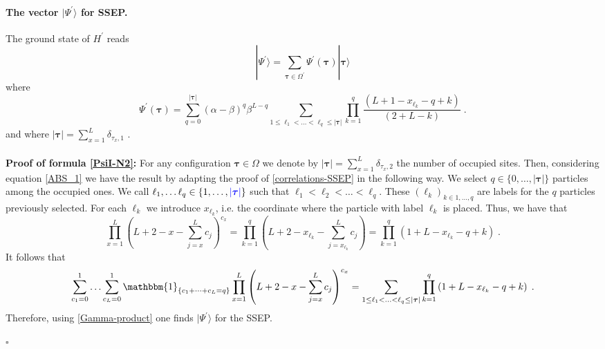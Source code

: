 \documentclass[10pt]{article}
\numberwithin{equation}{section}
\numberwithin{equation}{subsection}
\newcommand{\dt}{\;.}
\newcommand{\fra}[1]{\textcolor[rgb]{0,0,1}{#1}}
\begin{document}
{\paragraph{The vector $|\Psi^{'}\rangle$ for SSEP.} The ground state of $H^{'}$ reads
\begin{equation}
	|\Psi^{'}\rangle=\sum_{\bm{\tau}\in\Omega^{'}}\Psi^{'}(\bm{\tau})|\bm{\tau}\rangle
\end{equation}
where 
\begin{equation}\label{PsiI-N2}
	\Psi^{'}(\bm{\tau})=\sum_{q=0}^{|\bm{\tau}|}(\alpha-\beta)^{q}\beta^{L-q}\sum_{1\leq \ell_{1}<\ldots<\ell_{q}\leq |\bm{\tau}|}\prod_{k=1}^{q}\frac{\left(L+1-x_{\ell_{k}}-q+k\right)}{(2+L-k)}\dt
\end{equation}
and where $|\bm{\tau}|=\sum_{x=1}^{L}\delta_{\tau_{x},1}$ . \\ \\
 \textbf{Proof of formula \eqref{PsiI-N2}:}  For any configuration $\bm{\tau}\in \Omega$ we denote by  $|\bm{\tau}|=\sum_{x=1}^{L}\delta_{\tau_{x},2}$ the number of occupied sites. Then, considering equation \eqref{ABS_1} we have the result by adapting the proof of \eqref{correlations-SSEP} in the following way. We select $q\in\{0,\ldots,|\bm{\tau}|\}$ particles among the occupied ones. We call $\ell_{1},\ldots\ell_{q}\in \{1,\ldots,\fra{|\bm{\tau}|}\}$ such that $\ell_{1}<\ell_{2}<\ldots<\ell_{q}$. These $(\ell_{k})_{k\in {1,\ldots,q}}$ are labels for the $q$ particles previously selected. For each $\ell_{k}$ we introduce $x_{\ell_{k}}$, i.e. the coordinate where the particle with label $\ell_{k}$ is placed. Thus, we have that  
\begin{equation}
	\prod_{x=1}^{L}\left(L+2-x-\sum_{j=x}^{L}c_{j}\right)^{c_{x}}=\prod_{k=1}^{q}\left(L+2-x_{\ell_{k}}-\sum_{j=x_{\ell_{k}}}^{L}c_{j}\right)=\prod_{k=1}^{q}\left(1+L-x_{\ell_{k}}-q+k\right)\dt
\end{equation}
It follows that
\begin{equation}
	\sum_{c_{1}=0}^{1}\ldots\sum_{c_{L}=0}^{1}\mathbbm{1}_{\{c_{1}+\cdots+c_{L}=q\}}	\prod_{x=1}^{L}\left(L+2-x-\sum_{j=x}^{L}c_{j}\right)^{c_{x}}=\sum_{1\leq \ell_{1}<\ldots<\ell_{q}\leq |\bm{\tau}|}\prod_{k=1}^{q}\left(1+L-x_{\ell_{k}}-q+k\right)\dt
\end{equation} 
Therefore, using \eqref{Gamma-product}  one finds $|\Psi^{'}\rangle$ for the SSEP.
\begin{flushright}
	$\square$
\end{flushright}
}
\end{document}

